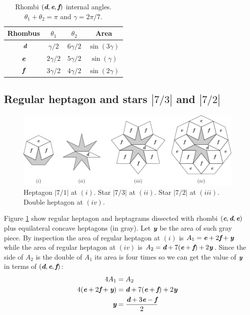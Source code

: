 \documentclass[11pt]{article}
\def\mathbi#1{\textbf{\em #1}}
\begin{document}
\begin{table}[H]
\begin{center}
\begin{tabular}{|c|c c| c |} \hline
Rhombus & $\theta_1$ & $\theta_2$ & Area \\ \hline\
$\mathbi{d}$ & $\gamma/2$ & $6\gamma/2$ & $\sin(3\gamma)$
\\[0.5ex] \hline
$\mathbi{e}$ & $2\gamma/2$ & $5\gamma/2$ & $\sin(\gamma)$
\\[0.5ex] \hline
$\mathbi{f}$ & $3\gamma/2$ & $4\gamma/2$ & $\sin(2\gamma)$
\\[0.5ex] \hline
\end{tabular}
\caption{Rhombi $(\mathbi{d},\mathbi{e},\mathbi{f})$ internal angles. $\theta_1 + \theta_2 = \pi$ and $\gamma = 2\pi/7$.} 
\label{tbl:def-angles}
\end{center}
\end{table}



\subsection{Regular heptagon and stars $|7/3|$ and $|7/2|$}

\begin{figure}[H]
\centering
\includegraphics[scale=1.1]{def/hepta}
\caption{Heptagon $|7/1|$ at $(i)$. Star $|7/3|$ at $(ii)$. Star $|7/2|$ at $(iii)$. Double heptagon at $(iv)$.}
\label{fig:def-hepta}
\end{figure}

Figure \ref{fig:def-hepta} show regular heptagon and heptagrams dissected with rhombi $(\mathbi{c},\mathbi{d},\mathbi{e})$ plus equilateral concave heptagons (in gray). Let $\mathbi{y}$ be the area of such gray piece. By inspection the area of regular heptagon at $(i)$ is $A_1 = \mathbi{e} + 2\mathbi{f} + \mathbi{y}$ while the area of regular heptagon at $(iv)$ is $A_2 = \mathbi{d} + 7(\mathbi{e}+\mathbi{f}) + 2\mathbi{y}$. Since the side of $A_2$ is the double of $A_1$ its area is four times so we can get the value of $\mathbi{y}$ in terms of $(\mathbi{d},\mathbi{e},\mathbi{f})$:
\begin{align}
4A_1 &= A_2 \nonumber\\
4(\mathbi{e} + 2\mathbi{f} + \mathbi{y}) &= \mathbi{d} + 7(\mathbi{e}+\mathbi{f}) + 2\mathbi{y} \nonumber\\
\mathbi{y} &= \frac{\mathbi{d} + 3\mathbi{e} - \mathbi{f}}2
\end{align}
\end{document}
